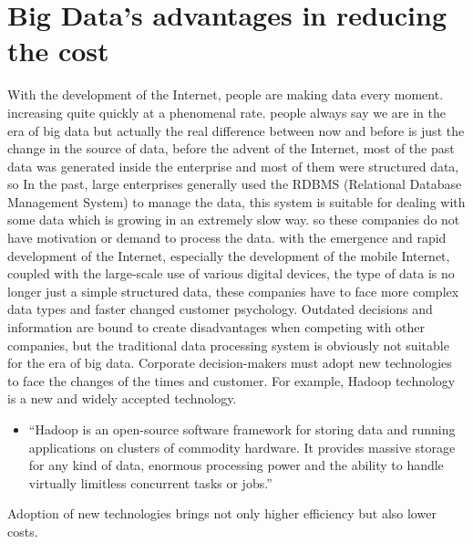 \documentclass[sigconf]{acmart}
\begin{document}
\section{Big Data's advantages in reducing the cost}
With the development of the Internet, people are making data every moment. increasing quite quickly at a phenomenal rate. people always say we are in the era of big data but actually the real difference between now and before is just the change in the source of data, before the advent of the Internet, most of the past data was generated inside the enterprise and most of them were structured data, so In the past, large enterprises generally used the RDBMS (Relational Database Management System)\cite{Wikipedia2017} to manage the data, this system is suitable for dealing with some data which is growing in an extremely slow way. so these companies do not have motivation or demand to process the data. with the emergence and rapid development of the Internet, especially the development of the mobile Internet, coupled with the large-scale use of various digital devices, the type of data is no longer just a simple structured data, these companies have to face more complex data types and faster changed customer psychology. Outdated decisions and information are bound to create disadvantages when competing with other companies, but the traditional data processing system is obviously not suitable for the era of big data. Corporate decision-makers must adopt new technologies to face the changes of the times and customer. For example, Hadoop technology is a new and widely accepted technology.
\begin{itemize}

  \item ``Hadoop is an open-source software framework for storing data and running applications on clusters of commodity hardware. It provides massive storage for any kind of data, enormous processing power and the ability to handle virtually limitless concurrent tasks or jobs\cite{sas1}.''
\end{itemize}
Adoption of new technologies brings not only higher efficiency but also lower costs.
\end{document}
